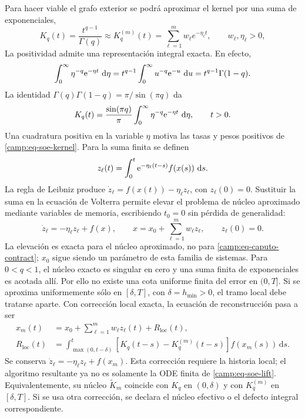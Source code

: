 Para hacer viable el grafo exterior se podrá aproximar el kernel por una suma
de exponenciales,
\begin{equation}
 K_q(t)=\frac{t^{q-1}}{\Gamma(q)}
 \approx K_q^{(m)}(t)=\sum_{\ell=1}^{m}w_\ell e^{-\eta_\ell t},
 \qquad w_\ell,\eta_\ell>0,
 \label{camp:eq-soe-kernel}
\end{equation}
La positividad admite una representación integral exacta. En efecto,
\[
 \int_0^\infty\eta^{-q}\mathrm e^{-\eta t}\,\,\mathrm d\eta
 =t^{q-1}\int_0^\infty u^{-q}\mathrm e^{-u}\,\,\mathrm d u
 =t^{q-1}\Gamma(1-q).
\]
La identidad \(\Gamma(q)\Gamma(1-q)=\pi/\sin(\pi q)\) da
\[
 K_q(t)=\frac{\sin(\pi q)}{\pi}
        \int_0^\infty\eta^{-q}\mathrm e^{-\eta t}\,\,\mathrm d\eta,
 \qquad t>0.
\]
Una cuadratura positiva en la variable \(\eta\) motiva las tasas y pesos
positivos de \cref{camp:eq-soe-kernel}. Para la suma finita se definen
\[
 z_\ell(t)=\int_0^t\mathrm e^{-\eta_\ell(t-s)}f(x(s))\,\,\mathrm d s.
\]
La regla de Leibniz produce
\(\dot z_\ell=f(x(t))-\eta_\ell z_\ell\), con \(z_\ell(0)=0\). Sustituir
la suma en la ecuación de Volterra permite elevar el problema de núcleo
aproximado mediante variables de memoria,
escribiendo \(t_0=0\) sin pérdida de generalidad:
\begin{equation}
 \dot z_\ell=-\eta_\ell z_\ell+f(x),
 \qquad
 x=x_0+\sum_{\ell=1}^{m}w_\ell z_\ell,
 \qquad z_\ell(0)=0.
 \label{camp:eq-soe-lift}
\end{equation}
La elevación es exacta para el núcleo aproximado, no para
\cref{camp:eq-caputo-contract}; \(x_0\) sigue siendo un parámetro de esta
familia de sistemas. Para \(0<q<1\), el núcleo exacto es singular en cero y
una suma finita de exponenciales es acotada allí. Por ello no existe una cota
uniforme finita del error en \((0,T]\). Si se aproxima uniformemente sólo en
\([\delta,T]\), con \(\delta=h_{\min}>0\), el tramo local debe tratarse aparte.
Con corrección local exacta, la ecuación de reconstrucción pasa a ser
\begin{align}
 x_m(t)&=x_0+\sum_{\ell=1}^{m}w_\ell z_\ell(t)+R_{\mathrm{loc}}(t),\\
 R_{\mathrm{loc}}(t)
 &=\int_{\max(0,t-\delta)}^t
   [K_q(t-s)-K_q^{(m)}(t-s)]f(x_m(s))\,\mathrm ds.
 \label{camp:eq-soe-local-correction}
\end{align}
Se conserva \(\dot z_\ell=-\eta_\ell z_\ell+f(x_m)\). Esta corrección
requiere la historia local; el algoritmo resultante ya no es solamente la ODE
finita de \cref{camp:eq-soe-lift}. Equivalentemente, su núcleo
\(\widetilde K_m\) coincide con \(K_q\) en \((0,\delta)\) y con
\(K_q^{(m)}\) en \([\delta,T]\). Si se usa otra corrección, se declara el
núcleo efectivo o el defecto integral correspondiente.

